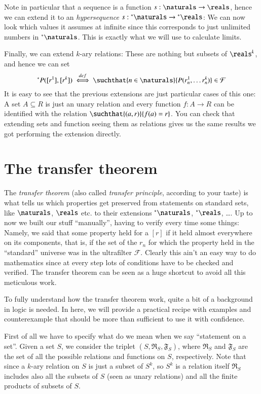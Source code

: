 \documentclass[adraft, copyright,creativecommons,sharealike,noncommercial]{eptcs}
\newcommand{\nstar}{{^*}}
\begin{document}
Note in particular that a sequence is a function $s:\naturals \to \reals$, hence we can extend it to an \emph{hypersequence} $s:\nstar \naturals \to \nstar  \reals$: We can now look which values it assumes at infinite since this corresponds to just unlimited numbers in $\nstar\naturals$. This is exactly what we will use to calculate limits.

Finally, we can extend $k$-ary relations: These are nothing but subsets of $\reals^k$, and hence we can set
\begin{equation*}
	\nstar P([r^1], [r^k]) \iffdef \suchthat{n \in \naturals}{P(r^1_n, \dots r^k_n)} \in \mathcal{F}
\end{equation*}
It is easy to see that the previous extensions are just particular cases of this one: A set $A \subseteq R$ is just an unary relation and every function $f:A \to R$ can be identified with the relation
$\suchthat{(a,r)}{f(a) = r}$. You can check that extending sets and function seeing them as relations gives us the same results we got performing the extension directly.
%
%
\section{The transfer theorem}
%
The \emph{transfer theorem} (also called \emph{transfer principle}, according to your taste) is what tells us which properties get preserved from statements on standard sets, like $\naturals$, $\reals$ etc. to their extensions $\nstar\naturals$, $\nstar \reals$, \dots. Up to now we built our stuff ``manually'', having to verify every time some things: Namely, we said that some property held for a $[r]$ if it held almost everywhere on its components, that is, if the set of the $r_n$ for which the property held in the ``standard'' universe was in the ultrafilter $\mathcal{F}$. Clearly this ain't an easy way to do mathematics since at every step lots of conditions have to be checked and verified. The transfer theorem can be seen as a huge shortcut to avoid all this meticulous work.

To fully understand how the transfer theorem work, quite a bit of a background in logic is needed. In here, we will provide a practical recipe with examples and counterexample that should be more than sufficient to use it with confidence.

First of all we have to specify what do we mean when we say ``statement on a set''. 
Given a set $S$, we consider the triplet $(S,\mathfrak{R}_S, \mathfrak{F}_S)$, where $\mathfrak{R}_S$ and $\mathfrak{F}_S$ are the set of all the possible relations and functions on $S$, respectively. Note that since a $k$-ary relation on $S$ is just a subset of $S^k$, so $S^k$ is a relation itself $\mathfrak{R}_S$ includes also all the subsets of $S$ (seen as unary relations) and all the finite products of subsets of $S$.
\end{document}
